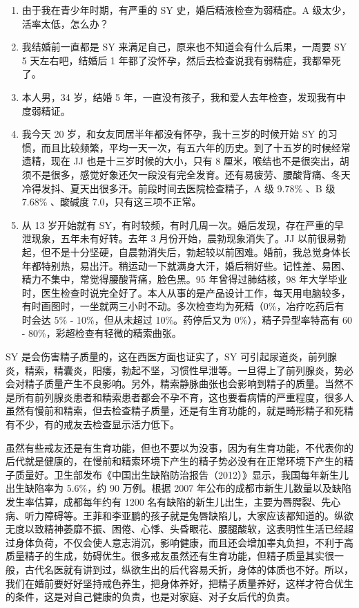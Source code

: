 \documentclass{ctexart}
\begin{document}
\begin{enumerate}
    \item 由于我在青少年时期，有严重的 SY 史，婚后精液检查为弱精症。A 级太少，活率太低，怎么办？
    \item 我结婚前一直都是 SY 来满足自己，原来也不知道会有什么后果，一周要 SY 5 天左右吧，结婚后 1 年都了没怀孕，然后去检查说我有弱精症，我都晕死了。
    \item 本人男，34 岁，结婚 5 年，一直没有孩子，我和爱人去年检查，发现我有中度弱精证。
    \item 我今天 20 岁，和女友同居半年都没有怀孕，我十三岁的时候开始 SY 的习惯，而且比较频繁，平均一天一次，有五六年的历史。到了十五岁的时候经常遗精，现在 JJ 也是十三岁时候的大小，只有 8 厘米，喉结也不是很突出，胡须不是很多，感觉好象还欠一段没有完全发育。还有易疲劳、腰酸背痛、冬天冷得发抖、夏天出很多汗。前段时间去医院检查精子，A 级 9.78\% 、B 级 7.68\% 、酸碱度 7.0，只有这三项不正常。
    \item 从 13 岁开始就有 SY，有时较频，有时几周一次。婚后发现，存在严重的早泄现象，五年未有好转。去年 3 月份开始，晨勃现象消失了。JJ 以前很易勃起，但不是十分坚硬，自晨勃消失后，勃起较以前困难。婚前，我总觉身体长年都特别热，易出汗。稍运动一下就满身大汗，婚后稍好些。记性差、易困、精力不集中，常觉得腰酸背痛，脸色黑。95 年曾得过肺结核，98 年大学毕业时，医生检查时说完全好了。本人从事的是产品设计工作，每天用电脑较多，有时画图时，一坐就两三小时不动。多次检查均为死精（0\%，冶疗吃药后有时会达 5\% - 10\%，但从未超过 10\%。药停后又为 0\%），精子异型率特高有 60 - 80\%，彩超检查有轻微的精索曲张。
\end{enumerate}

SY 是会伤害精子质量的，这在西医方面也证实了，SY 可引起尿道炎，前列腺炎，精索，精囊炎，阳痿，勃起不坚，习惯性早泄等。一旦得上了前列腺炎，势必会对精子质量产生不良影响。另外，精索静脉曲张也会影响到精子的质量。当然不是所有前列腺炎患者和精索患者都会不孕不育，这也要看病情的严重程度，很多人虽然有慢前和精索，但去检查精子质量，还是有生育功能的，就是畸形精子和死精有不少，有的戒友去检查显示活力低下。

虽然有些戒友还是有生育功能，但也不要以为没事，因为有生育功能，不代表你的后代就是健康的，在慢前和精索环境下产生的精子势必没有在正常环境下产生的精子质量好。卫生部发布《中国出生缺陷防治报告（2012）》显示，我国每年新生儿出生缺陷率为 5.6\%，约 90 万例。根据 2007 年公布的成都市新生儿数量以及缺陷发生率估算，成都每年约有 1200 名有缺陷的新生儿出生，主要为唇腭裂、先心病、听力障碍等。王菲和李亚鹏的孩子就是兔唇缺陷儿，大家应该都知道的。纵欲无度以致精神萎靡不振、困倦、心悸、头昏眼花、腰腿酸软，这表明性生活已经超过身体负荷，不仅会使人意志消沉，影响健康，而且还会增加睾丸负担，不利于高质量精子的生成，妨碍优生。很多戒友虽然还有生育功能，但精子质量其实很一般，古代名医就有讲到过，纵欲生出的后代容易夭折，身体的体质也不好。所以，我们在婚前要好好坚持戒色养生，把身体养好，把精子质量养好，这样才符合优生的条件，这是对自己健康的负责，也是对家庭、对子女后代的负责。
\end{document}
